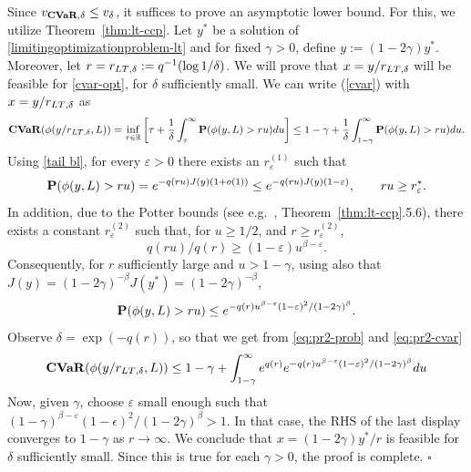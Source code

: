 \documentclass[a4paper, a4wide, 10pt, reqno]{amsart}
\theoremstyle{plain}
\renewcommand{\qed}{\hfill$\square$}
\begin{document}
Since $v_{{\bf CVaR}, \delta}\leq v_\delta$, it suffices to prove an asymptotic lower bound. For this, we utilize Theorem~\ref{thm:lt-ccp}. Let $y^*$ be a solution of \eqref{limitingoptimizationproblem-lt} and for fixed $\gamma>0$, define $y := (1-2\gamma) y^*$. Moreover, let  $r=r_{\rm{LT}, \delta}:=q^{-1}(\log 1/\delta)$. We will prove that $x=y/r_{\rm{LT}, \delta}$ will be feasible for \eqref{cvar-opt}, for $\delta$ sufficiently small. 
We can write (\ref{cvar}) with $x=y/r_{\rm{LT}, \delta}$ as
\begin{equation}\label{eq:pr2-cvar}
 {\bf CVaR} (\phi(y/r_{\rm{LT}, \delta},L)) =  \inf_{\tau\in\mathbb{R}} \left[\tau + \frac 1\delta \int_\tau^\infty {\bf P} (\phi (y,L) > ru) du \right]\leq 1-\gamma + \frac 1\delta \int_{1-\gamma}^\infty {\bf P} (\phi (y,L) > ru) du.
\end{equation}
Using \eqref{tail bl}, for every $\varepsilon >0$ there exists an $r^{(1)}_\varepsilon$ such that
\begin{equation}
     {\bf P} (\phi (y,L) > ru) = e^{-q(ru) J(y)(1+o(1))} \leq  e^{-q(ru) J(y) (1-\varepsilon)}, \qquad ru \geq r^*_\varepsilon.
\end{equation}
In addition, 
due to the Potter bounds (see e.g.\ \cite{Bingham_Goldie_Teugels_1987}, Theorem~\ref{thm:lt-ccp}.5.6), there exists a constant $r^{(2)}_{\varepsilon}$ such that, for $u\geq 1/2$, and $r\geq r^{(2)}_{\varepsilon}$,
\begin{equation}
     q(ru)/ q(r)  \geq (1-\varepsilon) u^{\beta-\varepsilon}.
\end{equation}
Consequently, for $r$ sufficiently large and $u>1-\gamma$, using also 
that $J(y) = (1-2\gamma)^{-\beta} J(y^*)= (1-2\gamma)^{-\beta}$,
\begin{equation}\label{eq:pr2-prob}
     {\bf P} (\phi (y,L) > ru)  \leq  e^{-q(r) u^{\beta - \varepsilon} (1-\varepsilon)^2/(1-2\gamma)^\beta}.
\end{equation}
Observe $\delta = \exp(-q(r))$, so that we get from \eqref{eq:pr2-prob} and \eqref{eq:pr2-cvar} 
\begin{equation}
 {\bf CVaR} (\phi(y/r_{\rm{LT}, \delta},L)) \leq 1-\gamma + \int_{1-\gamma}^\infty e^{ q(r)}  e^{-q(r) u^{\beta -\varepsilon}(1- \varepsilon)^2/(1-2\gamma)^\beta} du
 \end{equation}
Now, given $\gamma$, choose $\varepsilon$ small enough such that $(1-\gamma)^{\beta - \varepsilon} (1-\epsilon)^2/(1-2\gamma)^\beta>1$.
In that case, the RHS of the last display converges to $1-\gamma$ as $r\to\infty$. We conclude that $x=(1-2\gamma) y^*/r$ is feasible for $\delta$ sufficiently small. Since this is true for each $\gamma>0$, the proof is complete. 
\qed
\end{document}

